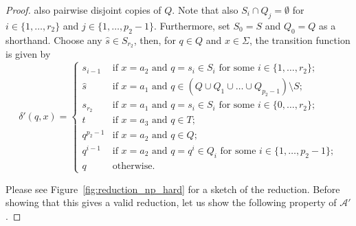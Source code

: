 \begin{proof}
 also pairwise disjoint 
copies of $Q$. Note that also $S_i \cap Q_j = \emptyset$
for $i \in \{1,\ldots, r_2 \}$ and $j \in \{1,\ldots, p_2-1\}$.
Furthermore, set $S_0 = S$ and $Q_0 = Q$ as a shorthand.
Choose any $\hat s \in S_{r_2}$, then, for $q \in Q$ and $x \in \Sigma$, the transition function is given by
\[
 \delta'(q, x) = \left\{
 \begin{array}{ll}
  s_{i-1} & \mbox{if } x = a_2 \mbox{ and } q = s_i \in S_i \mbox{ for some } i \in \{1,\ldots, r_2\}; \\ 
  \hat s & \mbox{if } x = a_1 \mbox{ and } q \in (Q \cup Q_1 \cup \ldots \cup Q_{p_2-1}) \setminus S; \\
  s_{r_2} & \mbox{if } x= a_1 \mbox{ and } q = s_i \in S_i \mbox{ for some } i \in \{0,\ldots,r_2\}; \\
  t       & \mbox{if } x = a_3 \mbox{ and } q \in T; \\
  q^{p_2-1} & \mbox{if } x = a_2 \mbox{ and } q \in Q; \\
  q^{i-1} & \mbox{if } x = a_2 \mbox{ and } q = q^i \in Q_i \mbox{ for some } i \in \{1,\ldots,p_2-1\}; \\
  q       & \mbox{otherwise}.
 \end{array}
 \right.
\]





Please see Figure~\ref{fig:reduction_np_hard} for a sketch
of the reduction.
Before showing that this gives a valid reduction, let us show the following property
of $\mathcal A'$.

\medskip


\end{proof}
